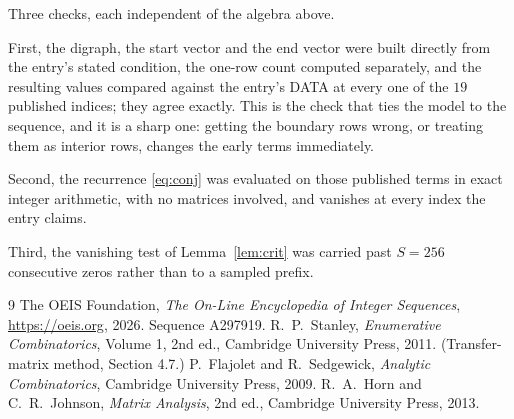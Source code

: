 \documentclass[11pt,a4paper]{article}
\theoremstyle{plain}
\theoremstyle{definition}
\begin{document}
Three checks, each independent of the algebra above.

First, the digraph, the start vector and the end vector were built directly from the
entry's stated condition, the one-row count computed separately, and the resulting values
compared against the entry's DATA at every one of the $19$ published indices; they
agree exactly. This is the check that ties the model to the sequence, and it is a sharp one:
getting the boundary rows wrong, or treating them as interior rows, changes the early terms
immediately.

Second, the recurrence \eqref{eq:conj} was evaluated on those published terms in exact
integer arithmetic, with no matrices involved, and vanishes at every index the entry claims.

Third, the vanishing test of Lemma~\ref{lem:crit} was carried past $S=256$ consecutive
zeros rather than to a sampled prefix.

\begin{thebibliography}{9}
 The OEIS Foundation, \emph{The On-Line Encyclopedia of Integer
Sequences}, \url{https://oeis.org}, 2026. Sequence A297919.
 R.~P.~Stanley, \emph{Enumerative Combinatorics}, Volume 1, 2nd ed.,
Cambridge University Press, 2011. (Transfer-matrix method, Section 4.7.)
 P.~Flajolet and R.~Sedgewick, \emph{Analytic Combinatorics}, Cambridge
University Press, 2009.
 R.~A.~Horn and C.~R.~Johnson, \emph{Matrix Analysis}, 2nd ed., Cambridge
University Press, 2013.
\end{thebibliography}
\end{document}
